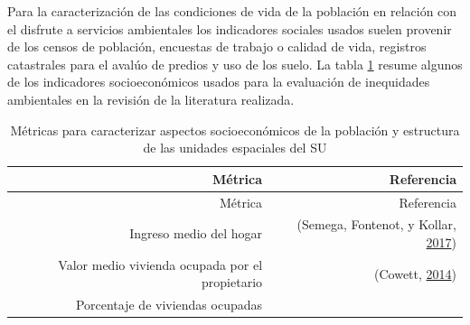 \documentclass[12pt,a4paper,openany]{book}
\theoremstyle{definition}
\theoremstyle{definition}
\theoremstyle{definition}
\theoremstyle{remark}
\begin{document}
Para la caracterización de las condiciones de vida de la población en
relación con el disfrute a servicios ambientales los indicadores
sociales usados suelen provenir de los censos de población, encuestas de
trabajo o calidad de vida, registros catastrales para el avalúo de
predios y uso de los suelo. La tabla \ref{tab:ind-SoEc} resume algunos
de los indicadores socioeconómicos usados para la evaluación de
inequidades ambientales en la revisión de la literatura realizada.

\begin{longtable}[]{@{}rr@{}}
\caption{\label{tab:ind-SoEc} Métricas para caracterizar aspectos
socioeconómicos de la población y estructura de las unidades espaciales
del SU}\tabularnewline
\toprule
\begin{minipage}[b]{0.57\columnwidth}\raggedleft\strut
Métrica\strut
\end{minipage} & \begin{minipage}[b]{0.31\columnwidth}\raggedleft\strut
Referencia\strut
\end{minipage}\tabularnewline
\midrule
\endfirsthead
\toprule
\begin{minipage}[b]{0.57\columnwidth}\raggedleft\strut
Métrica\strut
\end{minipage} & \begin{minipage}[b]{0.31\columnwidth}\raggedleft\strut
Referencia\strut
\end{minipage}\tabularnewline
\midrule
\endhead
\begin{minipage}[t]{0.57\columnwidth}\raggedleft\strut
Ingreso medio del hogar\strut
\end{minipage} & \begin{minipage}[t]{0.31\columnwidth}\raggedleft\strut
(Semega, Fontenot, y Kollar,
\protect\hyperlink{ref-semega2017income}{2017})\strut
\end{minipage}\tabularnewline
\begin{minipage}[t]{0.57\columnwidth}\raggedleft\strut
Valor medio vivienda ocupada por el propietario\strut
\end{minipage} & \begin{minipage}[t]{0.31\columnwidth}\raggedleft\strut
(Cowett, \protect\hyperlink{ref-cowett_methodology_2014}{2014})\strut
\end{minipage}\tabularnewline
\begin{minipage}[t]{0.57\columnwidth}\raggedleft\strut
Porcentaje de viviendas ocupadas\strut
\end{minipage} & \begin{minipage}[t]{0.31\columnwidth}\raggedleft\strut

\end{minipage}
\end{longtable}
\end{document}
